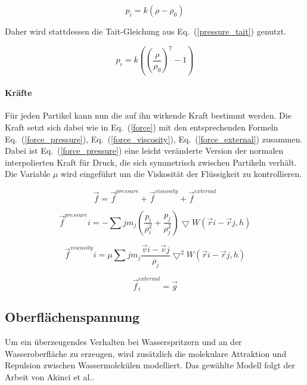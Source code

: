 \documentclass[a4paper]{paper}
\renewcommand{\eqref}[1]{Eq.~(\ref{#1})}
\begin{document}
\begin{equation}
\label{pressure}
p_i=k(\rho-\rho_0)
\end{equation}

Daher wird stattdessen die Tait-Gleichung aus \eqref{pressure_tait} genutzt.

\begin{equation}
\label{pressure_tait}
p_i = k((\frac{\rho}{\rho_{0}})^{7}-1)
\end{equation}


\paragraph{Kräfte}
Für jeden Partikel kann nun die auf ihn wirkende Kraft bestimmt werden. Die Kraft setzt sich dabei wie in \eqref{force} mit den entsprechenden Formeln \eqref{force_pressure}, \eqref{force_viscosity}, \eqref{force_external} zusammen.
Dabei ist \eqref{force_pressure} eine leicht veränderte Version der normalen interpolierten Kraft für Druck, die sich symmetrisch zwischen Partikeln verhält.
Die Variable $\mu$ wird eingeführt um die Viskosität der Flüssigkeit zu kontrollieren.

\begin{equation}
\label{force}
\vec{f} = \vec{f}^{pressure} + \vec{f}^{viscosity} + \vec{f}^{external}
\end{equation}

\begin{equation}
\label{force_pressure}
\vec{f}^{pressure}{i} = - \sum{j}m_{j}(\frac{p_{i}}{\rho_{i}^2} +\frac{p_{j}}{\rho_{j}^2})\bigtriangledown W(\vec{r}{i}-\vec{r}{j},h)
\end{equation}

\begin{equation}
\label{force_viscosity}
\vec{f}^{viscosity}{i} = \mu \sum{j}m_{j}\frac{\vec{v}{i} - \vec{v}{j}}{\rho_{j}}\bigtriangledown^2 W(\vec{r}{i}-\vec{r}{j},h)
\end{equation}

\begin{equation}
\label{force_external}
\vec{f}^{external}_{i} = \vec{g}
\end{equation}



\subsection{Oberflächenspannung}
Um ein überzeugendes Verhalten bei Wasserspritzern und an der Wasseroberfläche zu erzeugen, wird zusätzlich die molekulare Attraktion und Repulsion zwischen Wassermolekülen modelliert. Das gewählte Modell folgt der Arbeit von Akinci et al.\citep{SurfaceTension}.
\end{document}

